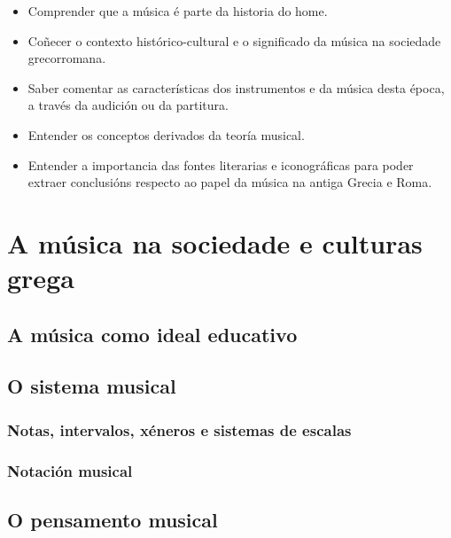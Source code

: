 \documentclass[a4paper, twoside]{templates/ociamthesis}
\providecommand{\tightlist}{%
  \setlength{\itemsep}{0pt}\setlength{\parskip}{0pt}}
\begin{document}
\begin{itemize}
\tightlist
\item
  Comprender que a música é parte da historia do home.
\item
  Coñecer o contexto histórico-cultural e o significado da música na sociedade grecorromana.
\item
  Saber comentar as características dos instrumentos e da música desta época, a través da audición ou da partitura.
\item
  Entender os conceptos derivados da teoría musical.
\item
  Entender a importancia das fontes literarias e iconográficas para poder extraer conclusións respecto ao papel da música na antiga Grecia e Roma.
\end{itemize}

\hypertarget{a-muxfasica-na-sociedade-e-culturas-grega}{%
\section{A música na sociedade e culturas grega}\label{a-muxfasica-na-sociedade-e-culturas-grega}}

\hypertarget{a-muxfasica-como-ideal-educativo}{%
\subsection{A música como ideal educativo}\label{a-muxfasica-como-ideal-educativo}}

\hypertarget{o-sistema-musical}{%
\subsection{O sistema musical}\label{o-sistema-musical}}

\hypertarget{notas-intervalos-xuxe9neros-e-sistemas-de-escalas}{%
\subsubsection{Notas, intervalos, xéneros e sistemas de escalas}\label{notas-intervalos-xuxe9neros-e-sistemas-de-escalas}}

\hypertarget{notaciuxf3n-musical}{%
\subsubsection{Notación musical}\label{notaciuxf3n-musical}}

\hypertarget{o-pensamento-musical}{%
\subsection{O pensamento musical}\label{o-pensamento-musical}}
\end{document}
